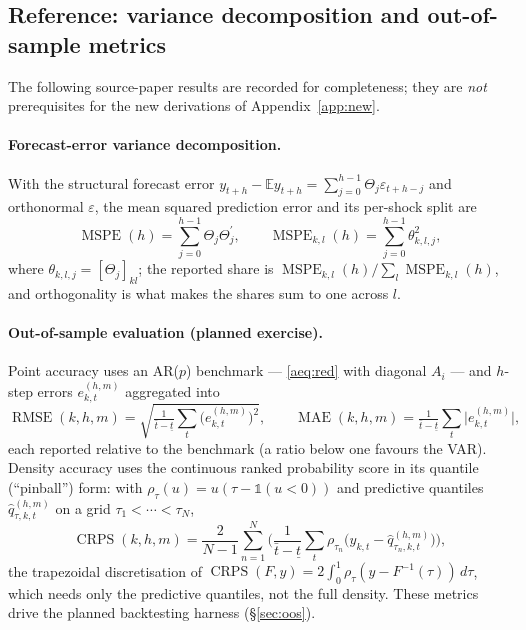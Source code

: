 \documentclass[11pt]{article}
\newcommand{\E}{\mathbb{E}}
\newcommand{\Id}{\mathbb{1}}
\newcommand{\tp}{^{\prime}}
\newcommand{\eps}{\varepsilon}
\DeclareMathOperator{\MSPE}{MSPE}
\DeclareMathOperator{\RMSE}{RMSE}
\DeclareMathOperator{\MAE}{MAE}
\DeclareMathOperator{\CRPS}{CRPS}
\theoremstyle{remark}
\begin{document}
\subsection{Reference: variance decomposition and out-of-sample metrics}\label{app:refresults}
The following source-paper results are recorded for completeness; they are
\emph{not} prerequisites for the new derivations of Appendix~\ref{app:new}.

\paragraph{Forecast-error variance decomposition.} With the structural forecast
error $y_{t+h}-\E y_{t+h}=\sum_{j=0}^{h-1}\Theta_j\eps_{t+h-j}$ and orthonormal
$\eps$, the mean squared prediction error and its per-shock split are
\begin{equation}
\MSPE(h)=\sum_{j=0}^{h-1}\Theta_j\Theta_j\tp,\qquad
\MSPE_{k,l}(h)=\sum_{j=0}^{h-1}\theta_{k,l,j}^2,
\tag{7$'$,\,7$''$}\label{aeq:fevd}
\end{equation}
where $\theta_{k,l,j}=[\Theta_j]_{kl}$; the reported share is
$\MSPE_{k,l}(h)/\sum_{l}\MSPE_{k,l}(h)$, and orthogonality is what makes the shares
sum to one across $l$.

\paragraph{Out-of-sample evaluation (planned exercise).} Point accuracy uses an
AR($p$) benchmark --- \eqref{aeq:red} with diagonal $A_i$ --- and $h$-step errors
$e^{(h,m)}_{k,t}$ aggregated into
\begin{equation}
\RMSE(k,h,m)=\sqrt{\tfrac{1}{\bar t-\underline t}\textstyle\sum_t\big(e^{(h,m)}_{k,t}\big)^2},
\qquad
\MAE(k,h,m)=\tfrac{1}{\bar t-\underline t}\textstyle\sum_t\big|e^{(h,m)}_{k,t}\big|,
\tag{9,\,10}\label{aeq:rmse}
\end{equation}
each reported relative to the benchmark (a ratio below one favours the VAR).
Density accuracy uses the continuous ranked probability score in its quantile
(``pinball'') form: with $\rho_\tau(u)=u(\tau-\Id(u<0))$ and predictive quantiles
$\hat q^{(h,m)}_{\tau,k,t}$ on a grid $\tau_1<\cdots<\tau_N$,
\begin{equation}
\CRPS(k,h,m)=\frac{2}{N-1}\sum_{n=1}^{N}
\Bigg(\frac{1}{\bar t-\underline t}\sum_{t}\rho_{\tau_n}\!\big(y_{k,t}-\hat q^{(h,m)}_{\tau_n,k,t}\big)\Bigg),
\tag{11}\label{aeq:crps}
\end{equation}
the trapezoidal discretisation of
$\CRPS(F,y)=2\int_0^1\rho_\tau(y-F^{-1}(\tau))\,d\tau$, which needs only the
predictive quantiles, not the full density. These metrics drive the planned
backtesting harness (\S\ref{sec:oos}).
\end{document}
